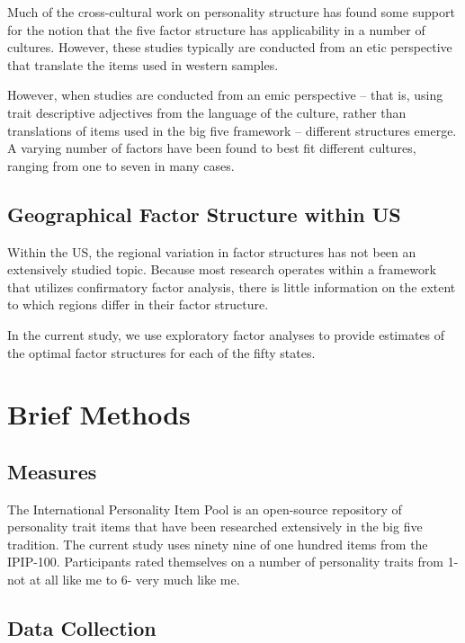 \documentclass[
]{article}
\begin{document}
Much of the cross-cultural work on personality structure has found some support for the notion that the five factor structure has applicability in a number of cultures. However, these studies typically are conducted from an etic perspective that translate the items used in western samples.

However, when studies are conducted from an emic perspective -- that is, using trait descriptive adjectives from the language of the culture, rather than translations of items used in the big five framework -- different structures emerge. A varying number of factors have been found to best fit different cultures, ranging from one to seven in many cases.

\hypertarget{geographical-factor-structure-within-us}{%
\subsection{Geographical Factor Structure within US}\label{geographical-factor-structure-within-us}}

Within the US, the regional variation in factor structures has not been an extensively studied topic. Because most research operates within a framework that utilizes confirmatory factor analysis, there is little information on the extent to which regions differ in their factor structure.

In the current study, we use exploratory factor analyses to provide estimates of the optimal factor structures for each of the fifty states.

\hypertarget{brief-methods}{%
\section{Brief Methods}\label{brief-methods}}

\hypertarget{measures}{%
\subsection{Measures}\label{measures}}

The International Personality Item Pool is an open-source repository of personality trait items that have been researched extensively in the big five tradition. The current study uses ninety nine of one hundred items from the IPIP-100. Participants rated themselves on a number of personality traits from 1- not at all like me to 6- very much like me.

\hypertarget{data-collection}{%
\subsection{Data Collection}\label{data-collection}}
\end{document}
